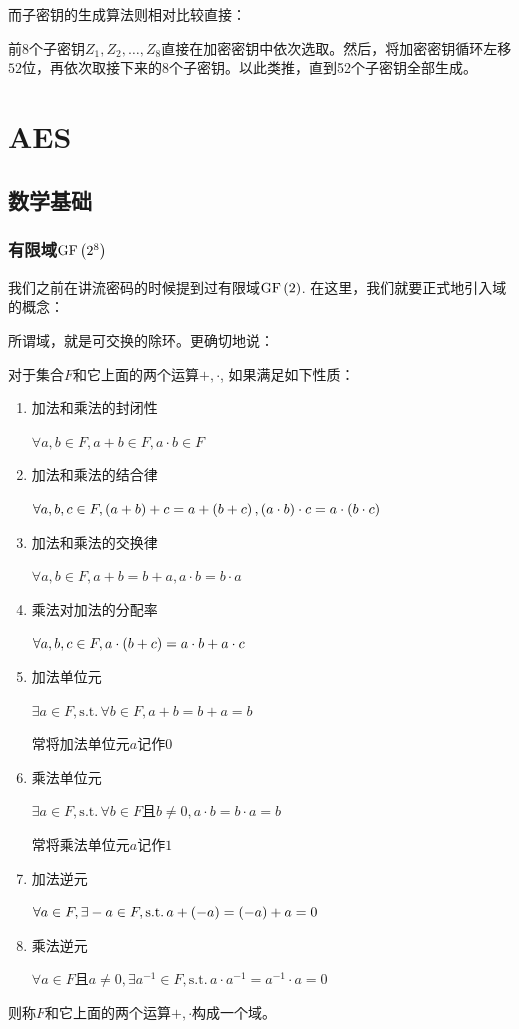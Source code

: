 而子密钥的生成算法则相对比较直接：\par
前8个子密钥$Z_1, Z_2, \ldots, Z_8$直接在加密密钥中依次选取。然后，将加密密钥循环左移$52$位，再依次取接下来的8个子密钥。以此类推，直到52个子密钥全部生成。
\section{AES}
\subsection{数学基础}
\subsubsection{有限域$\mathrm{GF}\left( {2^8}\right)$}
我们之前在讲流密码的时候提到过有限域$\mathrm{GF}\left( {2}\right)$. 在这里，我们就要正式地引入域的概念：\par
所谓域，就是可交换的除环。更确切地说：
\begin{Definition}
对于集合$F$和它上面的两个运算$+, \cdot$, 如果满足如下性质：
\begin{enumerate}
    \item 加法和乘法的封闭性\par
    $\forall a, b\in F, a+b\in F, a\cdot b\in F$
    \item 加法和乘法的结合律\par
    $\forall a, b, c\in F, \left( {a+b}\right)+c=a+\left( {b+c}\right), \left( {a\cdot b}\right)\cdot c=a\cdot\left( {b\cdot c}\right)$
    \item 加法和乘法的交换律\par
    $\forall a, b\in F, a+b=b+a, a\cdot b=b\cdot a$
    \item 乘法对加法的分配率\par
    $\forall a, b, c\in F, a\cdot\left( {b+c}\right)=a\cdot b+a\cdot c$
    \item 加法单位元\par
    $\exists a\in F, \mathrm{s.t.}\, \forall b\in F, a+b=b+a=b$\par
    常将加法单位元$a$记作$0$
    \item 乘法单位元\par
    $\exists a\in F, \mathrm{s.t.}\, \forall b\in F\text{且}b\neq 0, a\cdot b=b\cdot a=b$\par
    常将乘法单位元$a$记作$1$
    \item 加法逆元\par
    $\forall a\in F,\exists -a\in F, \mathrm{s.t.}\, a+\left( {-a}\right)=\left( {-a}\right)+a=0$
    \item 乘法逆元\par
    $\forall a\in F\text{且}a\neq 0, \exists a^{-1}\in F, \mathrm{s.t.}\, a\cdot a^{-1}=a^{-1}\cdot a=0$
\end{enumerate}
则称$F$和它上面的两个运算$+, \cdot$构成一个域。
\end{Definition}

